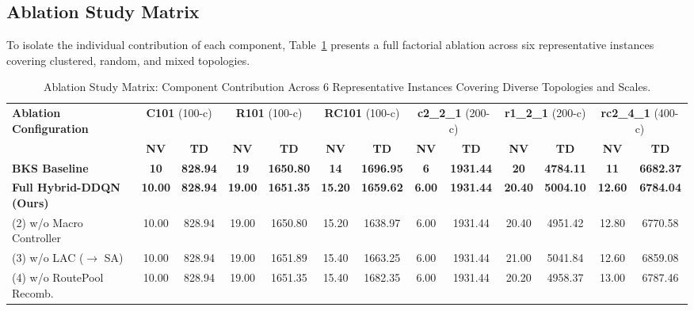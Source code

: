 \subsection{Ablation Study Matrix}
\label{sec:ablation_results}

To isolate the individual contribution of each component, Table~\ref{tab:ablation_matrix} presents a full factorial ablation across six representative instances covering clustered, random, and mixed topologies.

\begin{table}[!t]
\caption{Ablation Study Matrix: Component Contribution Across 6 Representative Instances Covering Diverse Topologies and Scales.}
\label{tab:ablation_matrix}
\centering
\footnotesize
\setlength{\tabcolsep}{2.5pt}
\begin{tabular*}{\textwidth}{@{\extracolsep{\fill}} l cc cc cc cc cc cc @{}}
\toprule
\multirow{2}{*}{\textbf{Ablation Configuration}} & \multicolumn{2}{c}{\textbf{C101} (100-c)} & \multicolumn{2}{c}{\textbf{R101} (100-c)} & \multicolumn{2}{c}{\textbf{RC101} (100-c)} & \multicolumn{2}{c}{\textbf{c2\_2\_1} (200-c)} & \multicolumn{2}{c}{\textbf{r1\_2\_1} (200-c)} & \multicolumn{2}{c}{\textbf{rc2\_4\_1} (400-c)} \\
\cmidrule(lr){2-3} \cmidrule(lr){4-5} \cmidrule(lr){6-7} \cmidrule(lr){8-9} \cmidrule(lr){10-11} \cmidrule(lr){12-13}
 & \textbf{NV} & \textbf{TD} & \textbf{NV} & \textbf{TD} & \textbf{NV} & \textbf{TD} & \textbf{NV} & \textbf{TD} & \textbf{NV} & \textbf{TD} & \textbf{NV} & \textbf{TD} \\
\midrule
\textbf{BKS Baseline} & \textbf{10} & \textbf{828.94} & \textbf{19} & \textbf{1650.80} & \textbf{14} & \textbf{1696.95} & \textbf{6} & \textbf{1931.44} & \textbf{20} & \textbf{4784.11} & \textbf{11} & \textbf{6682.37} \\
\midrule
\textbf{Full Hybrid-DDQN (Ours)} & \textbf{10.00} & \textbf{828.94} & \textbf{19.00} & \textbf{1651.35} & \textbf{15.20} & \textbf{1659.62} & \textbf{6.00} & \textbf{1931.44} & \textbf{20.40} & \textbf{5004.10} & \textbf{12.60} & \textbf{6784.04} \\
(2) w/o Macro Controller & 10.00 & 828.94 & 19.00 & 1650.80 & 15.20 & 1638.97 & 6.00 & 1931.44 & 20.40 & 4951.42 & 12.80 & 6770.58 \\
(3) w/o LAC ($\to$ SA) & 10.00 & 828.94 & 19.00 & 1651.89 & 15.40 & 1663.25 & 6.00 & 1931.44 & 21.00 & 5041.84 & 12.60 & 6859.08 \\
(4) w/o RoutePool Recomb. & 10.00 & 828.94 & 19.00 & 1651.35 & 15.40 & 1682.35 & 6.00 & 1931.44 & 20.20 & 4958.37 & 13.00 & 6787.46 \\

\end{tabular*}
\end{table}
